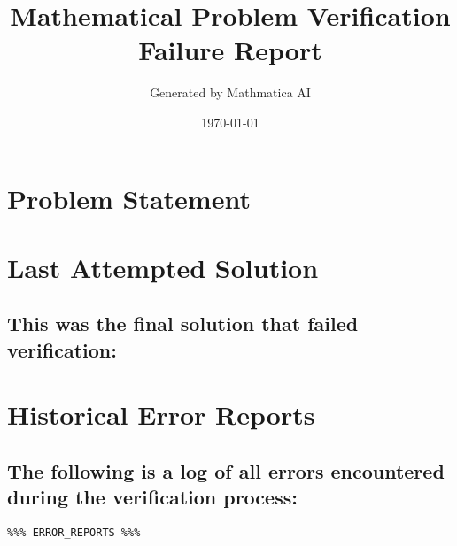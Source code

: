 \documentclass[12pt, a4paper]{article}
\title{\textbf{Mathematical Problem Verification Failure Report}}
\author{Generated by Mathmatica AI}
\date{\today}
\begin{document}
\maketitle
\thispagestyle{empty}
\newpage

\section*{Problem Statement}

\section*{Last Attempted Solution}
\subsection*{This was the final solution that failed verification:}

\section*{Historical Error Reports}
\subsection*{The following is a log of all errors encountered during the verification process:}
\begin{verbatim}
%%% ERROR_REPORTS %%%
\end{verbatim}
\end{document}
